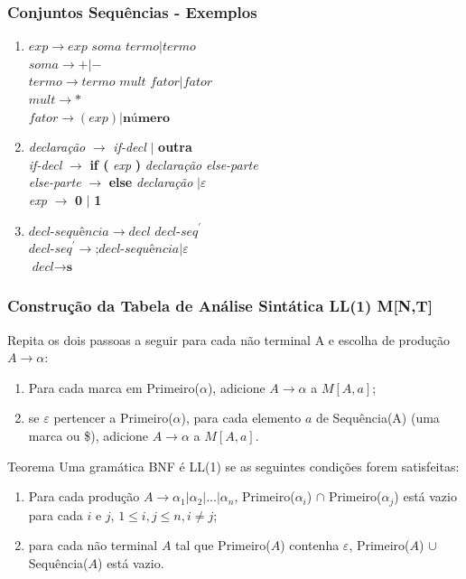 \documentclass[table]{beamer}
\begin{document}
\begin{frame}
   \frametitle{Conjuntos Sequências - Exemplos}
   \begin{enumerate}
      \item $\textit{exp} \to \textit{exp soma termo} | \textit{termo}$ \\
            $\textit{soma} \to +|-$ \\
            $\textit{termo} \to \textit{termo mult fator} | \textit{fator}$ \\
            $\textit{mult} \to *$ \\
            $\textit{fator} \to (\textit{exp}) | \textbf{número}$
  
      \item \textit{declaração} $\to$ \textit{if-decl} $|$ \textbf{outra} \\
            \textit{if-decl} $\to$ \textbf{if (} \textit{exp} \textbf{)} \textit{declaração} \textit{else-parte} \\ 
            \textit{else-parte} $\to$ \textbf{else} \textit{declaração} $| \varepsilon$ \\
            \textit{exp} $\to$ \textbf{0} $|$ \textbf{1}

      \item $\textit{decl-sequência} \to decl \textit{ decl-seq}^{'}$ \\
            $\textit{decl-seq}^{'} \to \textbf{;} \textit{decl-sequência} | \varepsilon$ \\
	    $\textit{decl} \to \textbf{s}$
   \end{enumerate}
\end{frame}

\begin{frame}
   \frametitle{Construção da Tabela de Análise Sintática LL(1) M[N,T]}
   Repita os dois passoas a seguir para cada não terminal A e escolha de produção $A \to \alpha$:
   \begin{enumerate}
      \item Para cada marca em Primeiro($\alpha$), adicione $A \to \alpha$ a $M[A, a]$;
      \item se $\varepsilon$ pertencer a Primeiro($\alpha$), para cada elemento $a$ de Sequência(A) (uma marca ou \$), adicione $A \to \alpha$ a $M[A, a]$.
   \end{enumerate}
   \begin{block}{Teorema}
   Uma gramática BNF é LL(1) se as seguintes condições forem satisfeitas:
   \begin{enumerate}
      \item Para cada produção $A \to \alpha_{1} | \alpha_{2} | ... | \alpha_{n}$, Primeiro($\alpha_{i}$) $\cap$ Primeiro($\alpha_{j}$) está vazio para cada $i$ e $j$, $1 \le i, j \le n, i \not= j$;
      \item para cada não terminal $A$ tal que Primeiro($A$) contenha $\varepsilon$, Primeiro($A$) $\cup$ Sequência($A$) está vazio.
   \end{enumerate}
   \end{block}
\end{frame}
\end{document}
